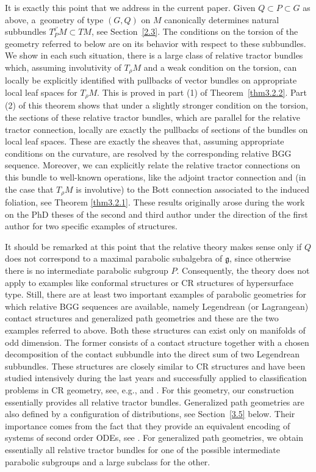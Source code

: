 \documentclass[10pt,a4paper]{amsart}
\numberwithin{equation}{section}
\def\frak{\mathfrak}
\begin{document}
It is exactly this point that we address in the current paper. Given
 $Q\subset P\subset G$ as above, a~geometry of type $(G,Q)$ on $M$ canonically
 determines natural subbundles $T^{i'}_PM\subset TM$, see Section~\ref{2.3}. The
 conditions on the torsion of the geometry referred to below are on its behavior
 with respect to these subbundles. We show in each such situation, there is a large
 class of relative tractor bundles which, assuming involutivity of $T_\rho M$ and a
 weak condition on the torsion, can locally be explicitly identified with pullbacks
 of vector bundles on appropriate local leaf spaces for $T_\rho M$. This is proved
 in part (1) of Theorem~\ref{thm3.2.2}. Part (2) of this theorem shows that under a
 slightly stronger condition on the torsion, the sections of these relative tractor
 bundles, which are parallel for the relative tractor connection, locally are exactly the pullbacks of sections of the bundles on local leaf spaces.
These are exactly the sheaves that, assuming appropriate conditions on the curvature,
are resolved by the corresponding relative BGG sequence. Moreover, we can explicitly
relate the relative tractor connections on this bundle to well-known operations, like
the adjoint tractor connection and \big(in the case that $T_\rho M$ is involutive\big) to the
Bott connection associated to the induced foliation, see Theorem
 \ref{thm3.2.1}. These results originally arose during the work on the PhD theses
of the second and third author under the direction of the first author for two
specific examples of structures.

It should be remarked at this point that the relative theory makes sense only if $Q$
does not correspond to a maximal parabolic subalgebra of $\frak g$, since otherwise
there is no intermediate parabolic subgroup $P$. Consequently, the theory does not
apply to examples like conformal structures or CR structures of hypersurface
type. Still, there are at least two important examples of parabolic geometries for
which relative BGG sequences are available, namely Legendrean (or Lagrangean) contact
structures and generalized path geometries and these are the two examples referred to
above. Both these structures can exist only on manifolds of odd dimension. The former
consists of a contact structure together with a chosen decomposition of the contact
subbundle into the direct sum of two Legendrean subbundles. These structures are
closely similar to CR structures and have been studied intensively during the last
years and successfully applied to classification problems in CR geometry, see, e.g.,
\cite{Doubrov-Medvedev-The,Doubrov-Merker-The} and \cite{MFMZ}. For this
geometry, our construction essentially provides all relative tractor
bundles. Generalized path geometries are also defined by a configuration of
distributions, see Section~\ref{3.5} below. Their importance comes from the fact that they
provide an equivalent encoding of systems of second order ODEs, see \cite{Fels}. For
generalized path geometries, we obtain essentially all relative tractor bundles for
one of the possible intermediate parabolic subgroups and a large subclass for the
other.
\end{document}
